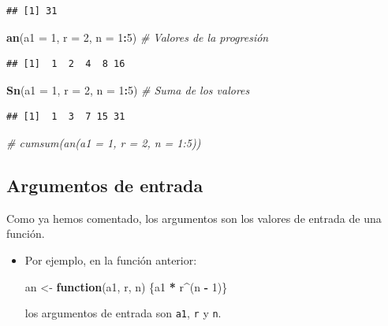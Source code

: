 \documentclass[]{book}
\newenvironment{Shaded}{\begin{snugshade}}{\end{snugshade}}
\newcommand{\KeywordTok}[1]{\textcolor[rgb]{0.13,0.29,0.53}{\textbf{#1}}}
\newcommand{\DataTypeTok}[1]{\textcolor[rgb]{0.13,0.29,0.53}{#1}}
\newcommand{\DecValTok}[1]{\textcolor[rgb]{0.00,0.00,0.81}{#1}}
\newcommand{\StringTok}[1]{\textcolor[rgb]{0.31,0.60,0.02}{#1}}
\newcommand{\CommentTok}[1]{\textcolor[rgb]{0.56,0.35,0.01}{\textit{#1}}}
\newcommand{\ControlFlowTok}[1]{\textcolor[rgb]{0.13,0.29,0.53}{\textbf{#1}}}
\newcommand{\OperatorTok}[1]{\textcolor[rgb]{0.81,0.36,0.00}{\textbf{#1}}}
\newcommand{\NormalTok}[1]{#1}
\begin{document}
\begin{verbatim}
## [1] 31
\end{verbatim}

\begin{Shaded}
\begin{Highlighting}[]
\KeywordTok{an}\NormalTok{(}\DataTypeTok{a1 =} \DecValTok{1}\NormalTok{, }\DataTypeTok{r =} \DecValTok{2}\NormalTok{, }\DataTypeTok{n =} \DecValTok{1}\OperatorTok{:}\DecValTok{5}\NormalTok{)    }\CommentTok{# Valores de la progresión}
\end{Highlighting}
\end{Shaded}

\begin{verbatim}
## [1]  1  2  4  8 16
\end{verbatim}

\begin{Shaded}
\begin{Highlighting}[]
\KeywordTok{Sn}\NormalTok{(}\DataTypeTok{a1 =} \DecValTok{1}\NormalTok{, }\DataTypeTok{r =} \DecValTok{2}\NormalTok{, }\DataTypeTok{n =} \DecValTok{1}\OperatorTok{:}\DecValTok{5}\NormalTok{)    }\CommentTok{# Suma de los valores}
\end{Highlighting}
\end{Shaded}

\begin{verbatim}
## [1]  1  3  7 15 31
\end{verbatim}

\begin{Shaded}
\begin{Highlighting}[]
\CommentTok{# cumsum(an(a1 = 1, r = 2, n = 1:5))}
\end{Highlighting}
\end{Shaded}

\subsection{Argumentos de entrada}\label{argumentos-de-entrada}

Como ya hemos comentado, los argumentos son los valores de entrada de
una función.

\begin{itemize}
\item
  Por ejemplo, en la función anterior:

\begin{Shaded}
\begin{Highlighting}[]
\NormalTok{an <-}\StringTok{ }\ControlFlowTok{function}\NormalTok{(a1, r, n) \{a1 }\OperatorTok{*}\StringTok{ }\NormalTok{r}\OperatorTok{^}\NormalTok{(n }\OperatorTok{-}\StringTok{ }\DecValTok{1}\NormalTok{)\}}
\end{Highlighting}
\end{Shaded}

  los argumentos de entrada son \texttt{a1}, \texttt{r} y \texttt{n}.
\end{itemize}
\end{document}
